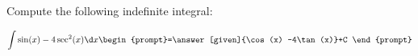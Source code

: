 \documentclass{ximera}
\author{Jim Talamo}
\begin{document}
\begin{exercise}
Compute the following indefinite integral:

\[
\int \sin(x)-4\sec^2(x) \d x 
\begin{prompt}=\answer[given]{\cos(x) -4\tan(x)}+C \end{prompt}
\]

\end{exercise}
\end{document}
